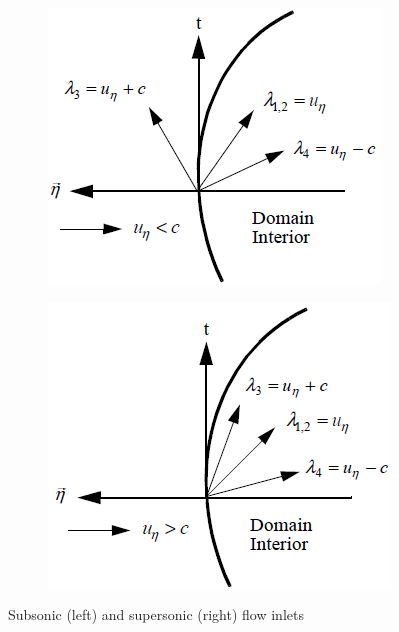 %
\begin{figure}[H]
        \centering
        \begin{subfigure}[b]{0.495\textwidth}
                \centering
                \includegraphics[width=\textwidth]{figures/sub_inlet_bc.png}
                \caption{\label{fig:sub_flow_inlet}}
        \end{subfigure}%
        \begin{subfigure}[b]{0.495\textwidth}
                \centering
                \includegraphics[width=\textwidth]{figures/sup_inlet_bc.png}
                \caption{\label{fig:sup_flow_inlet}}
        \end{subfigure}
        \caption{Subsonic (left) and supersonic (right) flow inlets\label{fig:inlet_sct3}}
\end{figure}
